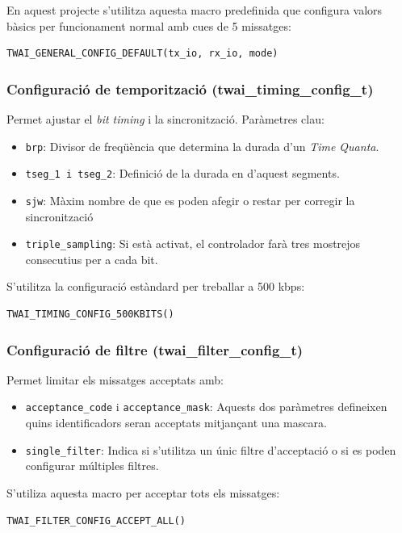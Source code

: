 \documentclass{tfgitic}[2024/07/01]
\begin{document}
En aquest projecte s'utilitza aquesta macro predefinida que configura valors bàsics per funcionament normal amb cues de 5 missatges:
\begin{verbatim}
TWAI_GENERAL_CONFIG_DEFAULT(tx_io, rx_io, mode)
\end{verbatim}

\subsubsection{Configuració de temporització (twai\_timing\_config\_t)}

Permet ajustar el \textit{bit timing} i la sincronització. Paràmetres clau:

\begin{itemize}
    \item \texttt{brp}: Divisor de freqüència que determina la durada d'un \emph{Time Quanta}. 
    \item \texttt{tseg\_1 i tseg\_2}: Definició de la durada en  d'aquest segments.
    \item \texttt{sjw}: Màxim nombre de  que es poden afegir o restar per corregir la sincronització
    \item \texttt{triple\_sampling}: Si està activat, el controlador farà tres mostrejos consecutius per a cada bit.
\end{itemize}

S'utilitza la configuració estàndard per treballar a 500 kbps:
\begin{verbatim}
TWAI_TIMING_CONFIG_500KBITS()
\end{verbatim}

\subsubsection{Configuració de filtre (twai\_filter\_config\_t)}

Permet limitar els missatges acceptats amb:

\begin{itemize}
    \item \texttt{acceptance\_code} i \texttt{acceptance\_mask}: Aquests dos paràmetres defineixen quins identificadors seran acceptats mitjançant una mascara.
    \item \texttt{single\_filter}: Indica si s'utilitza un únic filtre d'acceptació o si es poden configurar múltiples filtres.
\end{itemize}

S'utiliza aquesta macro per acceptar tots els missatges:
\begin{verbatim}
TWAI_FILTER_CONFIG_ACCEPT_ALL()
\end{verbatim}
\end{document}
